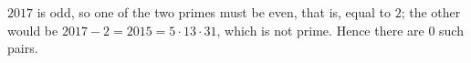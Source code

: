 $2017$ is odd, so one of the two primes must be even, that is, equal to $2$; the other would be $2017-2=2015=5\cdot13\cdot31$, which is not prime. Hence there are $\boxed{0}$ such pairs.
